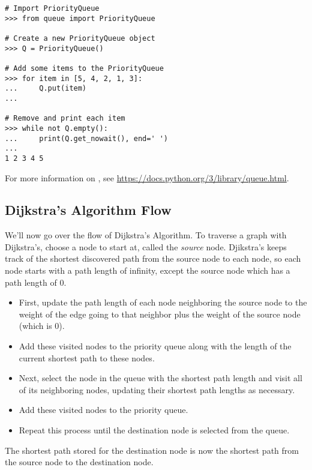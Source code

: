 \begin{lstlisting}
# Import PriorityQueue
>>> from queue import PriorityQueue

# Create a new PriorityQueue object
>>> Q = PriorityQueue()

# Add some items to the PriorityQueue
>>> for item in [5, 4, 2, 1, 3]:
...     Q.put(item)
...

# Remove and print each item
>>> while not Q.empty():
...     print(Q.get_nowait(), end=' ')
...
1 2 3 4 5
\end{lstlisting}

For more information on , see \url{https://docs.python.org/3/library/queue.html}.

\subsection*{Dijkstra's Algorithm Flow} %
We'll now go over the flow of Dijkstra's Algorithm.
To traverse a graph with Dijkstra's, choose a node to start at, called the \emph{source} node.
Djikstra's keeps track of the shortest discovered path from the source node to each node, so each node starts with a path length of infinity, except the source node which has a path length of 0.
\begin{itemize}
    \item First, update the path length of each node neighboring the source node to the weight of the edge going to that neighbor plus the weight of the source node (which is 0).
    \item Add these visited nodes to the priority queue along with the length of the current shortest path to these nodes.
    \item Next, select the node in the queue with the shortest path length and visit all of its neighboring nodes, updating their shortest path lengths as necessary.
    \item Add these visited nodes to the priority queue.
    \item Repeat this process until the destination node is selected from the queue.
\end{itemize}
The shortest path stored for the destination node is now the shortest path from the source node to the destination node.


